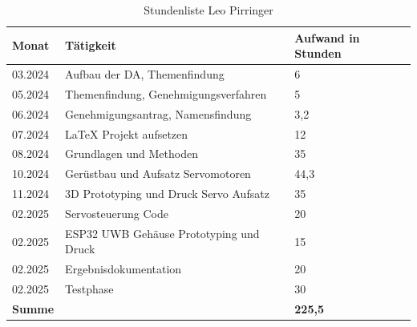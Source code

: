\begin{table}[h]
	\begin{tabular}{p{2.5cm} p{10.5cm} p{3cm}}
		\hline
		\textbf{Monat} & \textbf{Tätigkeit} & \textbf{Aufwand in Stunden} \\
		\hline
		03.2024 & Aufbau der DA, Themenfindung & 6 \\
		05.2024 & Themenfindung, Genehmigungsverfahren & 5 \\
		06.2024 & Genehmigungsantrag, Namensfindung & 3,2 \\
		07.2024 & LaTeX Projekt aufsetzen& 12 \\
		08.2024 & Grundlagen und Methoden & 35 \\
		10.2024 & Gerüstbau und Aufsatz Servomotoren & 44,3 \\
		11.2024 & 3D Prototyping und Druck Servo Aufsatz & 35 \\
		02.2025 & Servosteuerung Code & 20 \\
		02.2025 & ESP32 UWB Gehäuse Prototyping und Druck& 15\\
		02.2025 & Ergebnisdokumentation &  20\\
		02.2025 & Testphase & 30 \\
		
		\hline
		\textbf{Summe} & & \textbf{225,5} \\
		\hline
	\end{tabular}
	\caption{Stundenliste Leo Pirringer}
	\label{tab:arbeitsaufwand_Pirringer}
\end{table}